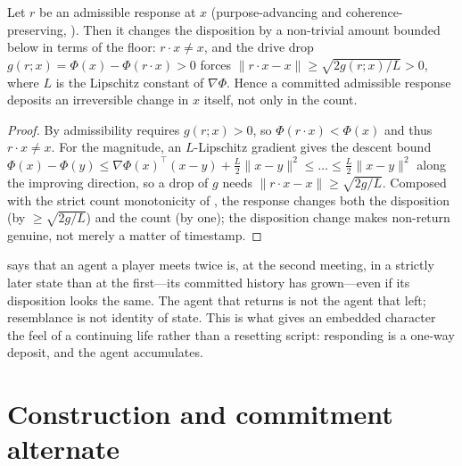 \documentclass[11pt,twocolumn,a4paper]{article}
\newcommand{\drive}{\Phi}            %
\newcommand{\resp}{r}                %
\newcommand{\gain}{g}                %
\newcommand{\norm}[1]{\lVert#1\rVert}
\begin{document}
\begin{proposition}
\label{prop:disp-moves}
Let $\resp$ be an admissible response at $x$ (purpose-advancing and
coherence-preserving, ). Then it changes the
disposition by a non-trivial amount bounded below in terms of the floor:
$\resp\!\cdot x\neq x$, and the drive drop $\gain(\resp;x)=\drive(x)-
\drive(\resp\!\cdot x)>0$ forces $\norm{\resp\!\cdot x-x}\ge
\sqrt{2\gain(\resp;x)/L}>0$, where $L$ is the Lipschitz constant of
$\nabla\drive$. Hence a committed admissible response deposits an
irreversible change in $x$ itself, not only in the count.
\end{proposition}

\begin{proof}
By  admissibility requires $\gain(\resp;x)>0$, so
$\drive(\resp\!\cdot x)<\drive(x)$ and thus $\resp\!\cdot x\neq x$. For the
magnitude, an $L$-Lipschitz gradient gives the descent bound
$\drive(x)-\drive(y)\le\nabla\drive(x)^\top(x-y)+\tfrac{L}{2}\norm{x-y}^2
\le\ldots\le \tfrac{L}{2}\norm{x-y}^2$ along the improving direction, so a
drop of $\gain$ needs $\norm{\resp\!\cdot x-x}\ge\sqrt{2\gain/L}$.
Composed with the strict count monotonicity of , the
response changes both the disposition (by $\ge\sqrt{2\gain/L}$) and the
count (by one); the disposition change makes non-return genuine, not merely
a matter of timestamp.
\end{proof}

\begin{remark}
\label{rem:new-agent}
 says that an agent a player meets twice is, at the
second meeting, in a strictly later state than at the first---its committed
history has grown---even if its disposition looks the same. The agent that
returns is not the agent that left; resemblance is not identity of state.
This is what gives an embedded character the feel of a continuing life
rather than a resetting script: responding is a one-way deposit, and the
agent accumulates.
\end{remark}

\section{Construction and commitment alternate}
\label{sec:phases}
\end{document}

